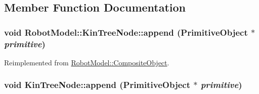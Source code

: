 \subsection{Member Function Documentation}
\hypertarget{class_robot_model_1_1_kin_tree_node_ae488de9b7fc97fb20690f66fead07391}{
\subsubsection[{append}]{\setlength{\rightskip}{0pt plus 5cm}void RobotModel::KinTreeNode::append ({\bf PrimitiveObject} $\ast$ {\em primitive})}}
\label{class_robot_model_1_1_kin_tree_node_ae488de9b7fc97fb20690f66fead07391}


Reimplemented from \hyperlink{class_robot_model_1_1_composite_object_ad33452f1246939d366ffbf02d1022a91}{RobotModel::CompositeObject}.\hypertarget{class_robot_model_1_1_kin_tree_node_af043fc57074a449364d2a6ec09be46a3}{
\subsubsection[{append}]{\setlength{\rightskip}{0pt plus 5cm}void KinTreeNode::append ({\bf PrimitiveObject} $\ast$ {\em primitive})}}
\label{class_robot_model_1_1_kin_tree_node_af043fc57074a449364d2a6ec09be46a3}


